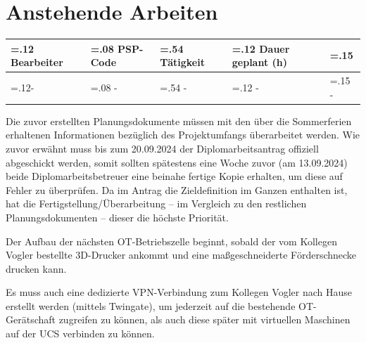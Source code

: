 \documentclass[
	headings=optiontotocandhead,%
	oneside,
	numbers=noenddot,%
	toc=flat, %
	10pt, %
	parskip=full, %
	listof=totoc, %
	listof=flat, %
	numbers=noenddot, %
	bibliography=totoc, %
	a4paper,DIV=14,
]{scrartcl}
\begin{document}
\section{Anstehende Arbeiten}
\begin{table}[h]
	\begin{tabularx} {\textwidth} {
			|>{\hsize=.12\hsize}X
			|>{\hsize=.08\hsize}X
			|>{\hsize=.54\hsize}X
			|>{\hsize=.12\hsize}X
			|>{\hsize=.15\hsize}X|
		}
		
		\hline
		\rowcolor[HTML]{D9D9D9} 
		\textbf{\normalsize{Bearbeiter}} & \textbf{\normalsize{PSP-Code}} & {\textbf{\normalsize{Tätigkeit}}} & \textbf{\normalsize{Dauer geplant (h)}} & \textbf{\smaller{Fertigstellung geplant}} \\ \hline
		- & - & - & - & - \\ \hline
	\end{tabularx}
\end{table}

Die zuvor erstellten Planungsdokumente müssen mit den über die Sommerferien erhaltenen Informationen bezüglich des Projektumfangs überarbeitet werden. Wie zuvor erwähnt muss bis zum 20.09.2024 der Diplomarbeitsantrag offiziell abgeschickt werden, somit sollten spätestens eine Woche zuvor (am 13.09.2024) beide Diplomarbeitsbetreuer eine beinahe fertige Kopie erhalten, um diese auf Fehler zu überprüfen. Da im Antrag die Zieldefinition im Ganzen enthalten ist, hat die Fertigstellung/Überarbeitung -- im Vergleich zu den restlichen Planungsdokumenten -- dieser die höchste Priorität.

Der Aufbau der nächsten OT-Betriebszelle beginnt, sobald der vom Kollegen Vogler bestellte 3D-Drucker ankommt und eine maßgeschneiderte Förderschnecke drucken kann.

Es muss auch eine dedizierte VPN-Verbindung zum Kollegen Vogler nach Hause erstellt werden (mittels Twingate), um jederzeit auf die bestehende OT-Gerätschaft zugreifen zu können, als auch diese später mit virtuellen Maschinen auf der UCS verbinden zu können.
\end{document}
